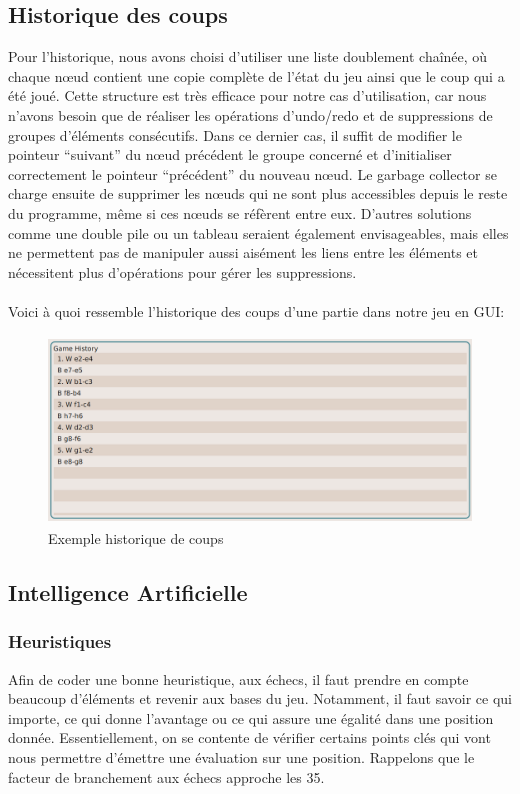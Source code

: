 \documentclass{article}
\begin{document}
\subsection{Historique des coups}
\par Pour l'historique, nous avons choisi d'utiliser une liste doublement chaînée, où chaque nœud contient une copie complète de l'état du jeu ainsi que le coup qui a été joué.
Cette structure est très efficace pour notre cas d'utilisation, car nous n'avons besoin que de réaliser les opérations d'undo/redo et de suppressions de groupes d'éléments consécutifs. Dans ce dernier cas, il suffit de modifier le pointeur ``suivant'' du nœud précédent le groupe concerné et d'initialiser correctement le pointeur ``précédent'' du nouveau nœud. Le garbage collector se charge ensuite de supprimer les nœuds qui ne sont plus accessibles depuis le reste du programme, même si ces nœuds se réfèrent entre eux.
D'autres solutions comme une double pile ou un tableau seraient également envisageables, mais elles ne permettent pas de manipuler aussi aisément les liens entre les éléments et nécessitent plus d'opérations pour gérer les suppressions.
\\
\\Voici à quoi ressemble l'historique des coups d'une partie dans notre jeu en GUI:\\

\begin{figure}[h]
    \caption{Exemple historique de coups}
    \centering
    \includegraphics[width=\textwidth,height=5.0cm,keepaspectratio]{historique-coups}
\end{figure}

\subsection{Intelligence Artificielle} \label{AI}
\subsubsection{Heuristiques}
Afin de coder une bonne heuristique, aux échecs, il faut prendre en compte beaucoup d'éléments et revenir aux bases du jeu.
Notamment, il faut savoir ce qui importe, ce qui donne l'avantage ou ce qui assure une égalité dans une position donnée. Essentiellement,
on se contente de vérifier certains points clés qui vont nous permettre d'émettre une évaluation sur une position.
Rappelons que le facteur de branchement aux échecs approche les 35.
\end{document}
